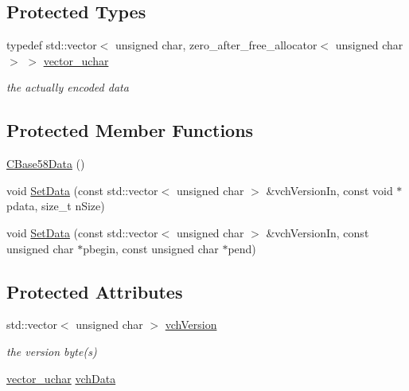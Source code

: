 \subsection*{Protected Types}
\begin{DoxyCompactItemize}
\item 
typedef std\+::vector$<$ unsigned char, zero\+\_\+after\+\_\+free\+\_\+allocator$<$ unsigned char $>$ $>$ \mbox{\hyperlink{class_c_base58_data_a193d64487a0b4f6df24f8bd380956ec1}{vector\+\_\+uchar}}
\begin{DoxyCompactList}\small\item\em the actually encoded data \end{DoxyCompactList}\end{DoxyCompactItemize}
\subsection*{Protected Member Functions}
\begin{DoxyCompactItemize}
\item 
\mbox{\hyperlink{class_c_base58_data_ae4f4ff42010299bc6fb228e21d6b2a15}{C\+Base58\+Data}} ()
\item 
void \mbox{\hyperlink{class_c_base58_data_afab1c06a0a4f631fd889434a2bc48c27}{Set\+Data}} (const std\+::vector$<$ unsigned char $>$ \&vch\+Version\+In, const void $\ast$pdata, size\+\_\+t n\+Size)
\item 
void \mbox{\hyperlink{class_c_base58_data_a8314b00685e590b4005be5cdfd36aeb9}{Set\+Data}} (const std\+::vector$<$ unsigned char $>$ \&vch\+Version\+In, const unsigned char $\ast$pbegin, const unsigned char $\ast$pend)
\end{DoxyCompactItemize}
\subsection*{Protected Attributes}
\begin{DoxyCompactItemize}
\item 
std\+::vector$<$ unsigned char $>$ \mbox{\hyperlink{class_c_base58_data_a110c1008f399053098a1bdf63408e923}{vch\+Version}}
\begin{DoxyCompactList}\small\item\em the version byte(s) \end{DoxyCompactList}\item 
\mbox{\hyperlink{class_c_base58_data_a193d64487a0b4f6df24f8bd380956ec1}{vector\+\_\+uchar}} \mbox{\hyperlink{class_c_base58_data_ae7ef7dfb93683aa4aaee8b74da5abb9c}{vch\+Data}}
\end{DoxyCompactItemize}


